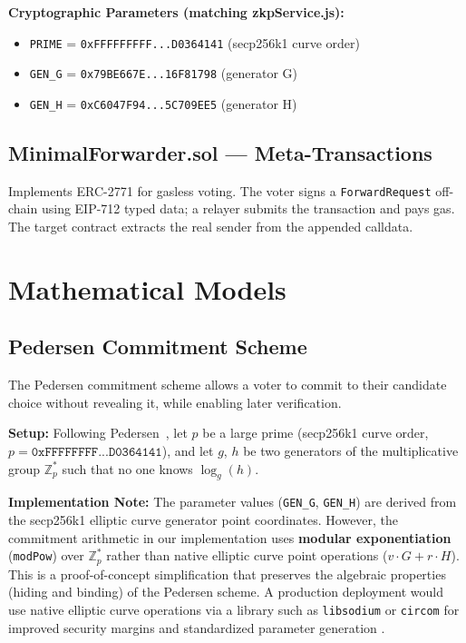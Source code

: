 \documentclass[oneside,a4paper,12pt]{book}
\begin{document}
\textbf{Cryptographic Parameters (matching zkpService.js):}
\begin{itemize}[leftmargin=1.5cm]
    \item \texttt{PRIME} = \texttt{0xFFFFFFFFF...D0364141} (secp256k1 curve order)
    \item \texttt{GEN\_G} = \texttt{0x79BE667E...16F81798} (generator G)
    \item \texttt{GEN\_H} = \texttt{0xC6047F94...5C709EE5} (generator H)
\end{itemize}

\subsection{MinimalForwarder.sol --- Meta-Transactions}
Implements ERC-2771 for gasless voting. The voter signs a \texttt{ForwardRequest} off-chain using EIP-712 typed data; a relayer submits the transaction and pays gas. The target contract extracts the real sender from the appended calldata.

\section{Mathematical Models}

\subsection{Pedersen Commitment Scheme}
\label{sec:pedersen}
The Pedersen commitment scheme allows a voter to commit to their candidate choice without revealing it, while enabling later verification.

\textbf{Setup:} Following Pedersen~\cite{pedersen1991}, let $p$ be a large prime (secp256k1 curve order, $p = \texttt{0xFFFFFFFF...D0364141}$), and let $g$, $h$ be two generators of the multiplicative group $\mathbb{Z}_p^*$ such that no one knows $\log_g(h)$.

\textbf{Implementation Note:} The parameter values (\texttt{GEN\_G}, \texttt{GEN\_H}) are derived from the secp256k1 elliptic curve generator point coordinates. However, the commitment arithmetic in our implementation uses \textbf{modular exponentiation} (\texttt{modPow}) over $\mathbb{Z}_p^*$ rather than native elliptic curve point operations ($v \cdot G + r \cdot H$). This is a proof-of-concept simplification that preserves the algebraic properties (hiding and binding) of the Pedersen scheme. A production deployment would use native elliptic curve operations via a library such as \texttt{libsodium} or \texttt{circom} for improved security margins and standardized parameter generation \cite{pedersen1991}.
\end{document}

